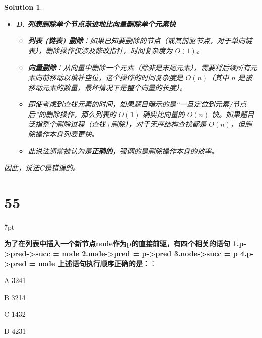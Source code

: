 \documentclass[UTF8]{report}
\newtheorem{solution}{Solution}
\theoremstyle{MyLineTheoremStyle} %
\theoremstyle{MyBlockTheoremStyle} %
\theoremstyle{MySubsubsectionStyle} %
\newenvironment{graybox}{%
        \def\FrameCommand{%
        \hspace{1pt}%
        {\color{gray}\small \vrule width 2pt}%
        {\color{graybox_color}\vrule width 4pt}%
        \colorbox{graybox_color}%
        }%
        \MakeFramed{\advance\hsize-\width\FrameRestore}%
        \noindent\hspace{-4.55pt}%
        \begin{adjustwidth}{}{7pt}%
        \vspace{2pt}\vspace{2pt}%
        }
        {%
        \vspace{2pt}\end{adjustwidth}\endMakeFramed%
        }
\begin{document}
\begin{solution}
\begin{itemize}
    \item \textbf{D. 列表删除单个节点渐进地比向量删除单个元素快}
    \begin{itemize}
        \item \textbf{列表 (链表) 删除}：如果已知要删除的节点（或其前驱节点，对于单向链表），删除操作仅涉及修改指针，时间复杂度为 $O(1)$。
        \item \textbf{向量删除}：从向量中删除一个元素（除非是末尾元素），需要将后续所有元素向前移动以填补空位，这个操作的时间复杂度是 $O(n)$（其中 $n$ 是被移动元素的数量，最坏情况下是整个向量的长度）。
        \item 即使考虑到查找元素的时间，如果题目暗示的是“一旦定位到元素/节点后”的删除操作，那么列表的 $O(1)$ 确实比向量的 $O(n)$ 快。如果题目泛指整个删除过程（查找+删除），对于无序结构查找都是 $O(n)$，但删除操作本身列表更快。
        \item 此说法通常被认为是\textbf{正确的}，强调的是删除操作本身的效率。
    \end{itemize}
\end{itemize}
因此，说法C是错误的。
\end{solution}


\section*{55}

\begin{graybox}
\textbf{为了在列表中插入一个新节点node作为p的直接前驱，有四个相关的语句
1.p->pred->succ = node
2.node->pred = p->pred
3.node->succ = p
4.p->pred = node
上述语句执行顺序正确的是：}：
\begin{circledenum}
    \item[A] 3241
    \item[B] 3214
    \item[C] 1432
    \item[D] 4231
\end{circledenum}
\end{graybox}
\end{document}
